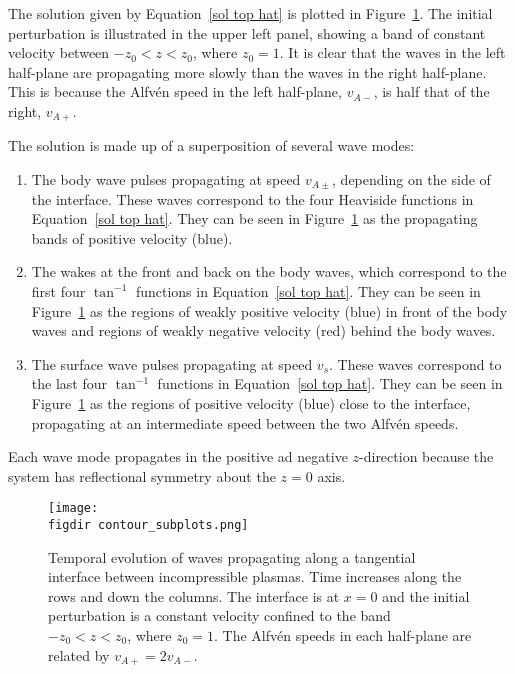 \documentclass[12pt]{../style-files/ociamthesis}
\begin{document}
The solution given by Equation~\eqref{sol top hat} is plotted in Figure~\ref{fig: vx incomp sol contour}. The initial perturbation is illustrated in the upper left panel, showing a band of constant velocity between $-z_0 < z < z_0$, where $z_0 = 1$. It is clear that the waves in the left half-plane are propagating more slowly than the waves in the right half-plane. This is because the Alfv\'{e}n speed in the left half-plane, $v_{A-}$, is half that of the right, $v_{A+}$.

The solution is made up of a superposition of several wave modes:
\begin{enumerate}
	\item The body wave pulses propagating at speed $v_{A\pm}$, depending on the side of the interface. These waves correspond to the four Heaviside functions in Equation~\eqref{sol top hat}. They can be seen in Figure~\ref{fig: vx incomp sol contour} as the propagating bands of positive velocity (blue).
	\item The wakes at the front and back on the body waves, which correspond to the first four $\tan^{-1}$ functions in Equation~\eqref{sol top hat}. They can be seen in Figure~\ref{fig: vx incomp sol contour} as the regions of weakly positive velocity (blue) in front of the body waves and regions of weakly negative velocity (red) behind the body waves.
	\item The surface wave pulses propagating at speed $v_{s}$. These waves correspond to the last four $\tan^{-1}$ functions in Equation~\eqref{sol top hat}. They can be seen in Figure~\ref{fig: vx incomp sol contour} as the regions of positive velocity (blue) close to the interface, propagating at an intermediate speed between the two Alfv\'{e}n speeds.
\end{enumerate}
Each wave mode propagates in the positive ad negative $z$-direction because the system has reflectional symmetry about the $z = 0$ axis.

\begin{figure}
	\centering
	\texttt{[image: \\figdir contour\_subplots.png]}
	\caption{Temporal evolution of waves propagating along a tangential interface between incompressible plasmas. Time increases along the rows and down the columns. The interface is at $x = 0$ and the initial perturbation is a constant velocity confined to the band $-z_0 < z < z_0$, where $z_0 = 1$. The Alfv\'{e}n speeds in each half-plane are related by $v_{A+} = 2v_{A-}$.}
	\label{fig: vx incomp sol contour}
\end{figure}
\end{document}
